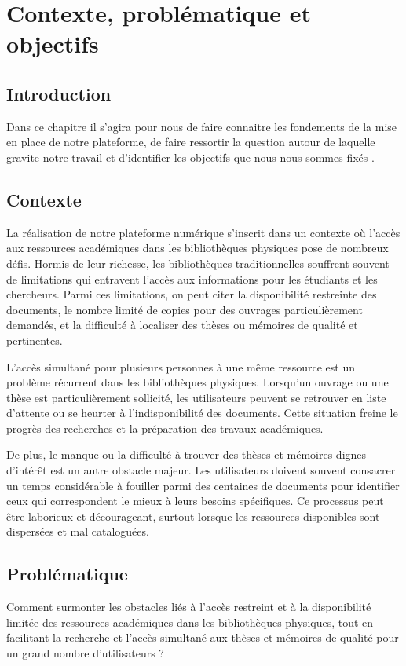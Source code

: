 \chapter{Contexte, problématique et objectifs}
\begin{spacing}{1.2}
\minitoc
\thispagestyle{MyStyle}
\end{spacing}
\newpage
\section*{Introduction}
Dans ce chapitre il s'agira pour nous de faire connaitre les fondements de la mise en place de notre plateforme, de faire ressortir la question autour de laquelle gravite notre travail et d'identifier les objectifs que nous nous sommes fixés . \par
\section{Contexte}
La réalisation de notre plateforme numérique s'inscrit dans un contexte où l'accès aux ressources académiques dans les bibliothèques physiques pose de nombreux défis. Hormis de leur richesse, les bibliothèques traditionnelles souffrent souvent de limitations qui entravent l'accès aux informations pour les étudiants et les chercheurs. Parmi ces limitations, on peut citer la disponibilité restreinte des documents, le nombre limité de copies pour des ouvrages particulièrement demandés, et la difficulté à localiser des thèses ou mémoires de qualité et pertinentes.\par
L'accès simultané pour plusieurs personnes à une même ressource est un problème récurrent dans les bibliothèques physiques. Lorsqu'un ouvrage ou une thèse est particulièrement sollicité, les utilisateurs peuvent se retrouver en liste d'attente ou se heurter à l'indisponibilité des documents. Cette situation freine le progrès des recherches et la préparation des travaux académiques.\par
De plus, le manque ou la difficulté à trouver des thèses et mémoires dignes d'intérêt est un autre obstacle majeur. Les utilisateurs doivent souvent consacrer un temps considérable à fouiller parmi des centaines de documents pour identifier ceux qui correspondent le mieux à leurs besoins spécifiques. Ce processus peut être laborieux et décourageant, surtout lorsque les ressources disponibles sont dispersées et mal cataloguées.
\par
\section{Problématique}
Comment surmonter les obstacles liés à l'accès restreint et à la disponibilité limitée des ressources académiques dans les bibliothèques physiques, tout en facilitant la recherche et l'accès simultané aux thèses et mémoires de qualité pour un grand nombre d’utilisateurs ?\par
